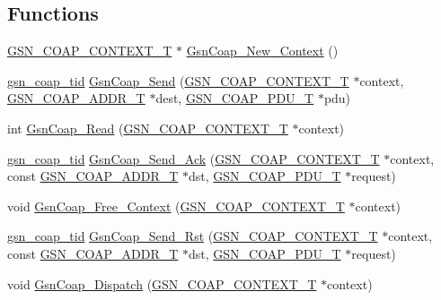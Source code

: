 \subsection*{Functions}
\begin{DoxyCompactItemize}
\item 
\hyperlink{a00479_ab529666f5a53e57a0760df584886eb5b}{GSN\_\-COAP\_\-CONTEXT\_\-T} $\ast$ \hyperlink{a00479_aff67506d5b81c42a53368b09856be56e}{GsnCoap\_\-New\_\-Context} ()
\item 
\hyperlink{a00479_adc7d7e60daa14476026edb6edc26b0d6}{gsn\_\-coap\_\-tid} \hyperlink{a00479_ae722562a1324ca9ce95ad65d039b9fcf}{GsnCoap\_\-Send} (\hyperlink{a00479_ab529666f5a53e57a0760df584886eb5b}{GSN\_\-COAP\_\-CONTEXT\_\-T} $\ast$context, \hyperlink{a00479_a5fe762c7fbc5387bb76de5d8adfc1bc4}{GSN\_\-COAP\_\-ADDR\_\-T} $\ast$dest, \hyperlink{a00538_afde87a99bfaad4a8beac3df27a309976}{GSN\_\-COAP\_\-PDU\_\-T} $\ast$pdu)
\item 
int \hyperlink{a00479_a2e15eb777cbf63ad9f6441fb0c9a04b2}{GsnCoap\_\-Read} (\hyperlink{a00479_ab529666f5a53e57a0760df584886eb5b}{GSN\_\-COAP\_\-CONTEXT\_\-T} $\ast$context)
\item 
\hyperlink{a00479_adc7d7e60daa14476026edb6edc26b0d6}{gsn\_\-coap\_\-tid} \hyperlink{a00479_accf0e4d45506f9eb32268fcfbbd5b7f9}{GsnCoap\_\-Send\_\-Ack} (\hyperlink{a00479_ab529666f5a53e57a0760df584886eb5b}{GSN\_\-COAP\_\-CONTEXT\_\-T} $\ast$context, const \hyperlink{a00479_a5fe762c7fbc5387bb76de5d8adfc1bc4}{GSN\_\-COAP\_\-ADDR\_\-T} $\ast$dst, \hyperlink{a00538_afde87a99bfaad4a8beac3df27a309976}{GSN\_\-COAP\_\-PDU\_\-T} $\ast$request)
\item 
void \hyperlink{a00479_a55363ad52ad92baa3b4360a556cc27a4}{GsnCoap\_\-Free\_\-Context} (\hyperlink{a00479_ab529666f5a53e57a0760df584886eb5b}{GSN\_\-COAP\_\-CONTEXT\_\-T} $\ast$context)
\item 
\hyperlink{a00479_adc7d7e60daa14476026edb6edc26b0d6}{gsn\_\-coap\_\-tid} \hyperlink{a00479_ae120897768373f4ce0d91bfce3ffb5aa}{GsnCoap\_\-Send\_\-Rst} (\hyperlink{a00479_ab529666f5a53e57a0760df584886eb5b}{GSN\_\-COAP\_\-CONTEXT\_\-T} $\ast$context, const \hyperlink{a00479_a5fe762c7fbc5387bb76de5d8adfc1bc4}{GSN\_\-COAP\_\-ADDR\_\-T} $\ast$dst, \hyperlink{a00538_afde87a99bfaad4a8beac3df27a309976}{GSN\_\-COAP\_\-PDU\_\-T} $\ast$request)
\item 
void \hyperlink{a00479_a97a4082c767911e4bd31c18140f020ec}{GsnCoap\_\-Dispatch} (\hyperlink{a00479_ab529666f5a53e57a0760df584886eb5b}{GSN\_\-COAP\_\-CONTEXT\_\-T} $\ast$context)
\item 

\end{DoxyCompactItemize}
